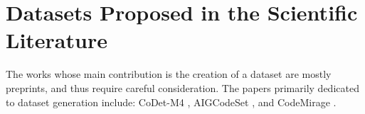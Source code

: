 \clearpage
\section{Datasets Proposed in the Scientific Literature}
The works whose main contribution is the 
creation of a dataset are mostly preprints, 
and thus require careful consideration. 
The papers primarily dedicated to dataset 
generation include: CoDet-M4 \cite{orel2025codet}, 
AIGCodeSet \cite{demirok2024aigcodeset}, 
and CodeMirage \cite{guo2025codemirage}.






\clearpage

\clearpage

